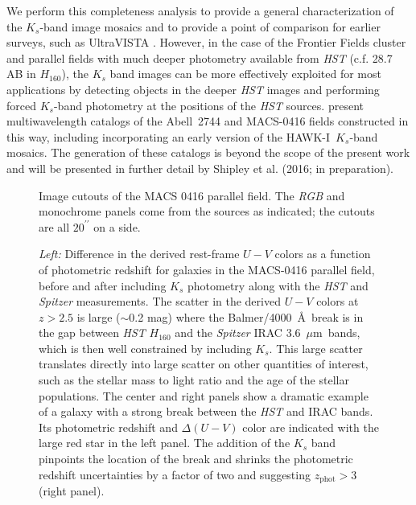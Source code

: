 \documentclass[preprint2]{aastex6}
\gdef\mum{$\mu\mathrm{m}$}
\gdef\arcsec{^{\prime\prime}}
\gdef\HAWKI{\mbox{HAWK-I}}
\begin{document}
We perform this completeness analysis to provide a general characterization of the $K_s$-band image mosaics and to provide a point of comparison for earlier surveys, such as UltraVISTA \citep{muzzin:13}.  However, in the case of the Frontier Fields cluster and parallel fields with much deeper photometry available from \textit{HST} (c.f. 28.7 AB in $H_{160}$), the $K_s$ band images can be more effectively exploited for most applications by detecting objects in the deeper \textit{HST} images and performing forced $K_s$-band photometry at the positions of the \textit{HST} sources.  \cite{merlin:16} present multiwavelength catalogs of the Abell~2744 and MACS-0416 fields constructed in this way, including incorporating an early version of the \HAWKI\ $K_s$-band mosaics.  The generation of these catalogs is beyond the scope of the present work and will be presented in further detail by Shipley et al. (2016; in preparation).

\begin{figure}[!t]
\caption{Image cutouts of the MACS 0416 parallel field.  The \textit{RGB} and monochrome panels come from the sources as indicated; the cutouts are all $20\arcsec$ on a side.
\label{fig:cutout}}  
\end{figure}


\begin{figure*}
\caption{\textit{Left:} Difference in the derived rest-frame $U-V$ colors as a function of photometric redshift for galaxies in the MACS-0416 parallel field, before and after including $K_s$ photometry along with the \textit{HST} and \textit{Spitzer} measurements.  The scatter in the derived $U-V$ colors at $z>2.5$ is large ($\sim$0.2 mag) where the Balmer/4000~\AA\ break is in the gap between \textit{HST} $H_{160}$ and the \textit{Spitzer} IRAC 3.6~\mum\ bands, which is then well constrained by including $K_s$.  This large scatter translates directly into large scatter on other quantities of interest, such as the stellar mass to light ratio and the age of the stellar populations.  The center and right panels show a dramatic example of a galaxy with a strong break between the \textit{HST} and IRAC bands.  Its photometric redshift and $\Delta(U-V)$ color are indicated with the large red star in the left panel.  The addition of the $K_s$ band pinpoints the location of the break and shrinks the photometric redshift uncertainties by a factor of two and suggesting $z_\mathrm{phot} > 3$ (right panel). \label{fig:delta_UV}}  
\end{figure*}
\end{document}
